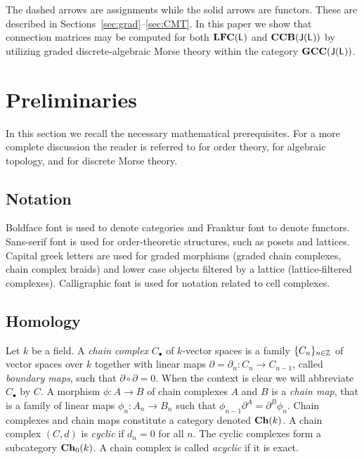The dashed arrows are assignments while the solid arrows are functors.  These are described in Sections~\ref{sec:grad}--\ref{sec:CMT}.   In this paper we show that connection matrices may be computed for both ${\bf LFC}({\mathsf L})$ and ${\bf CCB}({\mathsf J}({\mathsf L}))$  by utilizing graded discrete-algebraic Morse theory within the category ${\bf GCC}({\mathsf J}({\mathsf L}))$.
%
%
%


\section{Preliminaries}\label{sec:prelims}

In this section we recall  the necessary mathematical prerequisites.   For a more complete discussion the reader is referred to \cite{davey:priestley, roman} for order theory, \cite{lefschetz, gelfand, weibel} for algebraic topology, and \cite{focm,mn,sko} for discrete Morse theory.


\subsection{Notation}

Boldface font is used to denote categories and Franktur font to denote functors.  Sans-serif font is used for order-theoretic structures, such as posets and lattices.  Capital greek letters are used for graded morphisms (graded chain complexes, chain complex braids) and lower case objects filtered by a lattice (lattice-filtered complexes).  Calligraphic font is used for notation related to cell complexes.


\subsection{Homology}\label{sec:prelims:AT}

Let $k$ be a field.  
A {\em chain complex} $C_\bullet$ of $k$-vector spaces is a family $\{C_n\}_{n\in {\mathbb{Z}}}$ of vector spaces over $k$ together with linear maps $\partial=\partial_n \colon C_n\to C_{n-1}$, called \emph{boundary maps}, such that $\partial\circ\partial =0$.  
When the context is clear we will abbreviate $C_\bullet$ by $C$. 
A morphism $\phi\colon A\to B$ of chain complexes $A$ and $B$ is a {\em chain map}, that is a family of linear maps $\phi_n \colon A_n\to B_n$ such that $\phi_{n-1}\partial^A = \partial^B \phi_n$. 
Chain complexes and chain maps constitute a category denoted ${\bf Ch}(k)$.  A chain complex $(C,d)$ is {\em cyclic} if $d_n=0$ for all $n$.  The cyclic complexes form a subcategory ${\bf Ch}_0(k)$.  A chain complex is called {\em acyclic} if it is exact.

